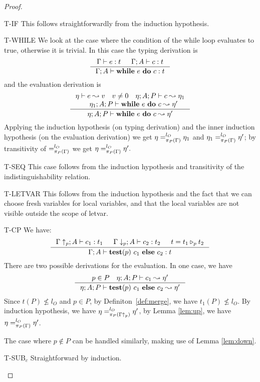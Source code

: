 {{{\begin{proof}
\begin{ProofEnumDesc}
\item[T-IF]
This follows straightforwardly from the induction hypothesis.

\item[T-WHILE]
We look at the case where the condition of the while loop
evaluates to true, otherwise it is trivial.
In this case the typing derivation is
$$
\inference
{\Gamma \vdash e : t & \Gamma ; A\vdash c : t  }
{\Gamma; A \vdash \lcWHILE{e}{c} : t }
$$
and the evaluation derivation is
$$
\inference{
\eta \vdash e \leadsto v\quad v\neq 0\quad
\eta;A; P \vdash c \leadsto \eta_1\\
\quad \eta_1 ; A ; P \vdash \lcWHILE{e}{c} \leadsto \eta'
}
{\eta;A; P \vdash \lcWHILE{e}{c} \leadsto \eta'}
$$
Applying the induction hypothesis (on typing derivation)
and the inner induction hypothesis (on the evaluation derivation)
we get $\eta =^{l_O}_{\app{\Gamma}{P}} \eta_1$ and $\eta_1 =^{l_O}_{\app{\Gamma}{P}} \eta'$; by transitivity of $=^{l_O}_{\app{\Gamma}{P}}$ we get $\eta =^{l_O}_{\app{\Gamma}{P}} \eta'.$

\item[T-SEQ] This case follows from the induction hypothesis
and transitivity of the indistinguishability relation.

\item[T-LETVAR] This follows from the induction hypothesis
and the fact that we can choose fresh variables for local
variables, and that the local variables are not visible
outside the scope of letvar.

\item[T-CP]
We have:
$$
\inference
{\Gamma\uparrow_{p} ; A \vdash c_1 : t_1 &
\Gamma\downarrow_{p} ; A\vdash c_2 : t_2 &
t = \omerge{p}{t_1}{t_2}}
{\Gamma; A\vdash \lcCP{p}{c_1}{c_2} : t}
$$
There are two possible derivations for the evaluation.
In one case, we have
$$
\inference{p\in P \quad \eta; A; P \vdash c_1 \leadsto \eta'}
{\eta; A ; P \vdash \lcCP{p}{c_1}{c_2} \leadsto \eta'}
$$
Since $t(P) \nleq l_{O}$ and $p \in P$, by Definiton~\ref{def:merge},
we have $t_1(P) \nleq l_{O}$.
By induction hypothesis, we have $\eta =_{\app{\Gamma\uparrow_{p}}{P}}^{l_{O}} \eta'$,
by Lemma \ref{lem:up}, we have $\eta =_{\app{\Gamma}{P}}^{l_{O}} \eta'$.

The case where $p \notin P$ can be handled similarly,
making use of Lemma \ref{lem:down}.

\item[T-SUB$_c$] Straightforward by induction.
\end{ProofEnumDesc}
\end{proof}

}}}
